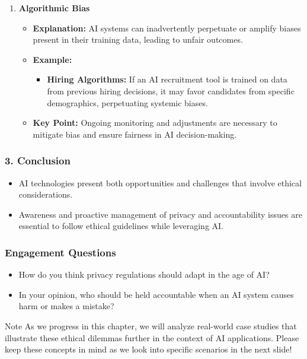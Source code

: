 \documentclass[aspectratio=169]{beamer}
\begin{document}
\begin{frame}[fragile]
\begin{enumerate}
        \item \textbf{Algorithmic Bias}
            \begin{itemize}
                \item \textbf{Explanation:} AI systems can inadvertently perpetuate or amplify biases present in their training data, leading to unfair outcomes.
                \item \textbf{Example:} 
                    \begin{itemize}
                        \item \textbf{Hiring Algorithms:} If an AI recruitment tool is trained on data from previous hiring decisions, it may favor candidates from specific demographics, perpetuating systemic biases.
                    \end{itemize}
                \item \textbf{Key Point:} Ongoing monitoring and adjustments are necessary to mitigate bias and ensure fairness in AI decision-making.
            \end{itemize}
    \end{enumerate}
\end{frame}

\begin{frame}[fragile]
    \frametitle{3. Conclusion}
    \begin{itemize}
        \item AI technologies present both opportunities and challenges that involve ethical considerations.
        \item Awareness and proactive management of privacy and accountability issues are essential to follow ethical guidelines while leveraging AI.
    \end{itemize}
\end{frame}

\begin{frame}[fragile]
    \frametitle{Engagement Questions}
    \begin{itemize}
        \item How do you think privacy regulations should adapt in the age of AI?
        \item In your opinion, who should be held accountable when an AI system causes harm or makes a mistake?
    \end{itemize}
    \begin{block}{Note}
        As we progress in this chapter, we will analyze real-world case studies that illustrate these ethical dilemmas further in the context of AI applications. Please keep these concepts in mind as we look into specific scenarios in the next slide!
    \end{block}
\end{frame}
\end{document}
